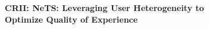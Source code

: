 \documentclass{proposalnsf}
\begin{document}





\begin{center}
{\bf\Large CRII: NeTS: Leveraging User Heterogeneity to \\Optimize Quality of Experience} \\
\smallskip
\end{center}
\end{document}
